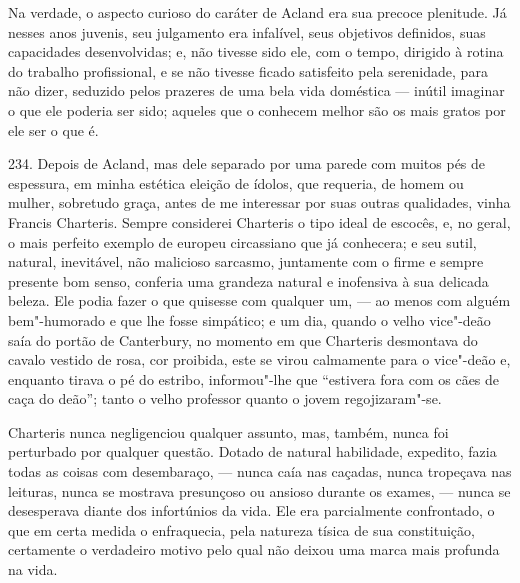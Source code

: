 Na verdade, o aspecto curioso do caráter de Acland era sua precoce
plenitude. Já nesses anos juvenis, seu julgamento era infalível, seus
objetivos definidos, suas capacidades desenvolvidas; e, não tivesse sido
ele, com o tempo, dirigido à rotina do trabalho profissional, e se não
tivesse ficado satisfeito pela serenidade, para não dizer, seduzido
pelos prazeres de uma bela vida doméstica --- inútil imaginar o que ele
poderia ser sido; aqueles que o conhecem melhor são os mais gratos por
ele ser o que é.

234. Depois de Acland, mas dele separado por uma parede com muitos pés
de espessura, em minha estética eleição de ídolos, que requeria, de
homem ou mulher, sobretudo graça, antes de me interessar por suas outras
qualidades, vinha Francis Charteris. Sempre considerei Charteris o tipo
ideal de escocês, e, no geral, o mais perfeito exemplo de europeu
circassiano que já conhecera; e seu sutil, natural, inevitável, não
malicioso sarcasmo, juntamente com o firme e sempre presente bom senso,
conferia uma grandeza natural e inofensiva à sua delicada beleza. Ele
podia fazer o que quisesse com qualquer um, --- ao menos com alguém
bem"-humorado e que lhe fosse simpático; e um dia, quando o velho
vice"-deão saía do portão de Canterbury, no momento em que Charteris
desmontava do cavalo vestido de rosa, cor proibida, este se virou
calmamente para o vice"-deão e, enquanto tirava o pé do estribo,
informou"-lhe que ``estivera fora com os cães de caça do deão''; tanto o
velho professor quanto o jovem regojizaram"-se.

Charteris nunca negligenciou qualquer assunto, mas, também, nunca foi
perturbado por qualquer questão. Dotado de natural habilidade, expedito,
fazia todas as coisas com desembaraço, --- nunca caía nas caçadas, nunca
tropeçava nas leituras, nunca se mostrava presunçoso ou ansioso durante
os exames, --- nunca se desesperava diante dos infortúnios da vida. Ele
era parcialmente confrontado, o que em certa medida o enfraquecia, pela
natureza tísica de sua constituição, certamente o verdadeiro motivo pelo
qual não deixou uma marca mais profunda na vida.

